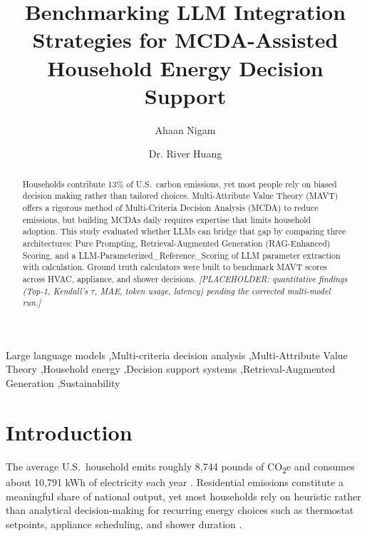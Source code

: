 \documentclass[final,3p,times]{elsarticle}
\begin{document}
\begin{frontmatter}
\title{Benchmarking LLM Integration Strategies for MCDA-Assisted Household Energy Decision Support}
\author{Ahaan Nigam}

\author{Dr. River Huang}
\begin{abstract}
Households contribute 13\% of U.S.\ carbon emissions, yet most people rely on biased decision making rather than tailored choices. Multi-Attribute Value Theory (MAVT) offers a rigorous method of Multi-Criteria Decision Analysis (MCDA) to reduce emissions, but building MCDAs daily requires expertise that limits household adoption. This study evaluated whether LLMs can bridge that gap by comparing three architectures: Pure Prompting, Retrieval-Augmented Generation (RAG-Enhanced) Scoring, and a LLM-Parameterized\_Reference\_Scoring of LLM parameter extraction with calculation. Ground truth calculators were built to benchmark MAVT scores across HVAC, appliance, and shower decisions. \textit{[PLACEHOLDER: quantitative findings (Top-1, Kendall's $\tau$, MAE, token usage, latency) pending the corrected multi-model run.]}
\end{abstract}
\begin{keyword}
Large language models \sep Multi-criteria decision analysis \sep Multi-Attribute Value Theory \sep Household energy \sep Decision support systems \sep Retrieval-Augmented Generation \sep Sustainability
\end{keyword}
\end{frontmatter}

\section{Introduction}
\label{sec:intro}

The average U.S.\ household emits roughly 8,744 pounds of
CO\textsubscript{2}e and consumes about 10,791 kWh of electricity
each year \cite{epa_household2024,eia2022}. Residential emissions
constitute a meaningful share of national output, yet most households
rely on heuristic rather than analytical decision-making for recurring
energy choices such as thermostat setpoints, appliance scheduling, and
shower duration \cite{kollmuss2002,bobadilla2018}.
\end{document}
